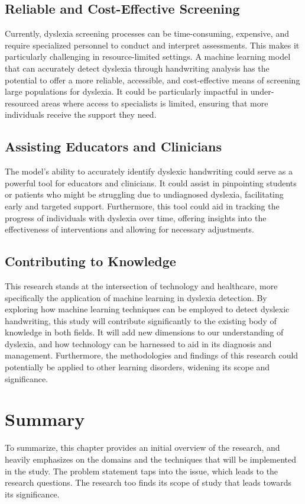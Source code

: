 \subsection{Reliable and Cost-Effective Screening}
Currently, dyslexia screening processes can be time-consuming, expensive, and require specialized personnel to conduct and interpret assessments. This makes it particularly challenging in resource-limited settings. A machine learning model that can accurately detect dyslexia through handwriting analysis has the potential to offer a more reliable, accessible, and cost-effective means of screening large populations for dyslexia. It could be particularly impactful in under-resourced areas where access to specialists is limited, ensuring that more individuals receive the support they need.

\subsection{Assisting Educators and Clinicians}
The model's ability to accurately identify dyslexic handwriting could serve as a powerful tool for educators and clinicians. It could assist in pinpointing students or patients who might be struggling due to undiagnosed dyslexia, facilitating early and targeted support. Furthermore, this tool could aid in tracking the progress of individuals with dyslexia over time, offering insights into the effectiveness of interventions and allowing for necessary adjustments.

\subsection{Contributing to Knowledge}
This research stands at the intersection of technology and healthcare, more specifically the application of machine learning in dyslexia detection. By exploring how machine learning techniques can be employed to detect dyslexic handwriting, this study will contribute significantly to the existing body of knowledge in both fields. It will add new dimensions to our understanding of dyslexia, and how technology can be harnessed to aid in its diagnosis and management. Furthermore, the methodologies and findings of this research could potentially be applied to other learning disorders, widening its scope and significance.

\section{Summary}
To summarize, this chapter provides an initial overview of the research, and heavily emphasizes on the domains and the techniques that will be implemented in the study. The problem statement taps into the issue, which leads to the research questions. The research too finds its scope of study that leads towards its significance.